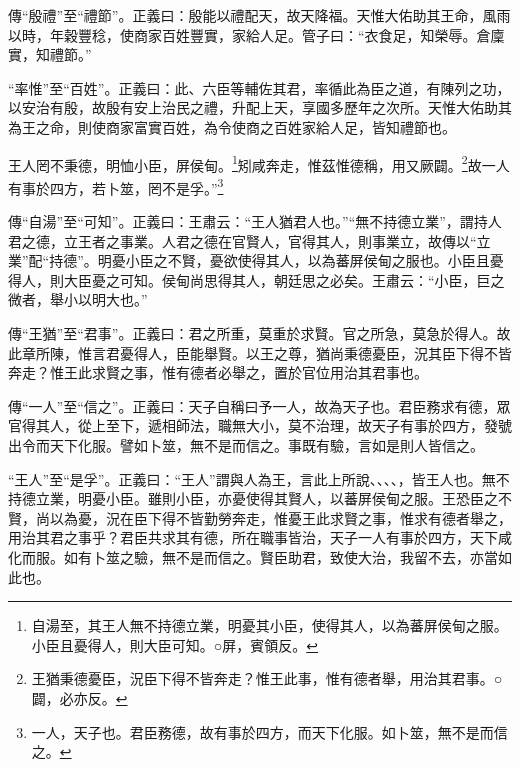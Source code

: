 {\noindent\zhuan{}\fzbyks 傳“殷禮”至“禮節”。正義曰：殷能以禮配天，故天降福。天惟大佑助其王命，風雨以時，年穀豐稔，使商家百姓豐實，家給人足。管子曰：“衣食足，知榮辱。倉廩實，知禮節。” \par}

{\noindent\shu{}\fzkt “率惟”至“百姓”。正義曰：此、六臣等輔佐其君，率循此為臣之道，有陳列之功，以安治有殷，故殷有安上治民之禮，升配上天，享國多歷年之次所。天惟大佑助其為王之命，則使商家富實百姓，為令使商之百姓家給人足，皆知禮節也。 \par}

王人罔不秉德，明恤小臣，屏侯甸。\footnote{自湯至，其王人無不持德立業，明憂其小臣，使得其人，以為蕃屏侯甸之服。小臣且憂得人，則大臣可知。○屏，賓領反。}矧咸奔走，惟茲惟德稱，用又厥闢。\footnote{王猶秉德憂臣，況臣下得不皆奔走？惟王此事，惟有德者舉，用治其君事。○闢，必亦反。}故一人有事於四方，若卜筮，罔不是孚。”\footnote{一人，天子也。君臣務德，故有事於四方，而天下化服。如卜筮，無不是而信之。}


{\noindent\zhuan{}\fzbyks 傳“自湯”至“可知”。正義曰：王肅云：“王人猶君人也。”“無不持德立業”，謂持人君之德，立王者之事業。人君之德在官賢人，官得其人，則事業立，故傳以“立業”配“持德”。明憂小臣之不賢，憂欲使得其人，以為蕃屏侯甸之服也。小臣且憂得人，則大臣憂之可知。侯甸尚思得其人，朝廷思之必矣。王肅云：“小臣，巨之微者，舉小以明大也。” \par}

{\noindent\zhuan{}\fzbyks 傳“王猶”至“君事”。正義曰：君之所重，莫重於求賢。官之所急，莫急於得人。故此章所陳，惟言君憂得人，臣能舉賢。以王之尊，猶尚秉德憂臣，況其臣下得不皆奔走？惟王此求賢之事，惟有德者必舉之，置於官位用治其君事也。 \par}

{\noindent\zhuan{}\fzbyks 傳“一人”至“信之”。正義曰：天子自稱曰予一人，故為天子也。君臣務求有德，眾官得其人，從上至下，遞相師法，職無大小，莫不治理，故天子有事於四方，發號出令而天下化服。譬如卜筮，無不是而信之。事既有驗，言如是則人皆信之。 \par}

{\noindent\shu{}\fzkt “王人”至“是孚”。正義曰：“王人”謂與人為王，言此上所說、、、、，皆王人也。無不持德立業，明憂小臣。雖則小臣，亦憂使得其賢人，以蕃屏侯甸之服。王恐臣之不賢，尚以為憂，況在臣下得不皆勤勞奔走，惟憂王此求賢之事，惟求有德者舉之，用治其君之事乎？君臣共求其有德，所在職事皆治，天子一人有事於四方，天下咸化而服。如有卜筮之驗，無不是而信之。賢臣助君，致使大治，我留不去，亦當如此也。 \par}

